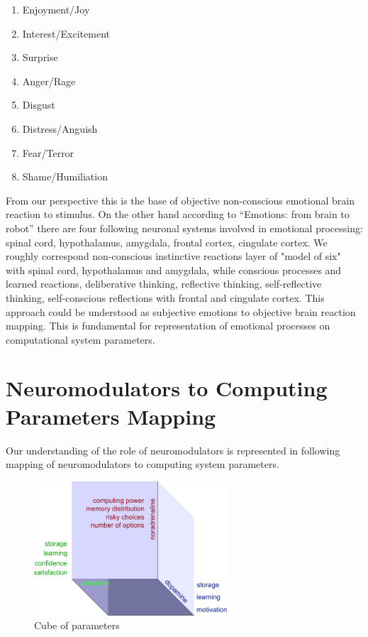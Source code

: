 \begin{enumerate}
 \item  Enjoyment/Joy
 \item  Interest/Excitement
 \item  Surprise
 \item  Anger/Rage
 \item  Disgust
 \item  Distress/Anguish
 \item  Fear/Terror
 \item  Shame/Humiliation
\end{enumerate}

From our perspective this is the base of objective non-conscious emotional brain reaction to stimulus. On the other hand according to ``Emotions: from brain to robot'' \cite{emotionsbraintorobot} there are four following neuronal systems involved in emotional processing: spinal cord, hypothalamus, amygdala, frontal cortex, cingulate cortex. 
We roughly correspond non-conscious instinctive reactions layer of "model of six" \cite{emotionmachine} with spinal cord, hypothalamus and amygdala, while conscious processes and learned reactions, deliberative thinking, reflective thinking, self-reflective thinking, self-conscious reflections with frontal and cingulate cortex. This approach could be understood as subjective emotions to objective brain reaction mapping. This is fundamental for representation of emotional processes on computational system parameters.

\section{Neuromodulators to Computing Parameters Mapping}

Our understanding of the role of neuromodulators \cite{cubeofemotions, emotionsbraintorobot} is represented in following mapping of neuromodulators to computing system parameters.

\begin{figure}
\begin{center}
 \includegraphics[height=5cm]{figure3_cube_of_parameters}
\end{center}
\caption{Cube of parameters}
\end{figure}

